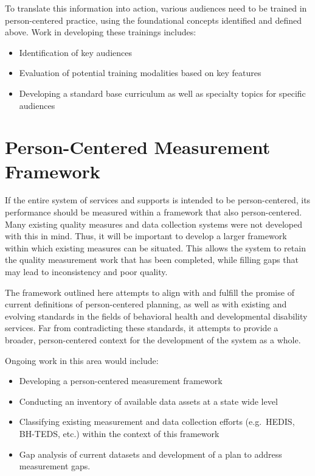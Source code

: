 \documentclass[
]{book}
\providecommand{\tightlist}{%
  \setlength{\itemsep}{0pt}\setlength{\parskip}{0pt}}
\begin{document}
To translate this information into action, various audiences need to be trained in person-centered practice, using the foundational concepts identified and defined above. Work in developing these trainings includes:

\begin{itemize}
\tightlist
\item
  Identification of key audiences
\item
  Evaluation of potential training modalities based on key features
\item
  Developing a standard base curriculum as well as specialty topics for specific audiences
\end{itemize}

\hypertarget{measure}{%
\chapter{Person-Centered Measurement Framework}\label{measure}}

If the entire system of services and supports is intended to be person-centered, its performance should be measured within a framework that also person-centered. Many existing quality measures and data collection systems were not developed with this in mind. Thus, it will be important to develop a larger framework within which existing measures can be situated. This allows the system to retain the quality measurement work that has been completed, while filling gaps that may lead to inconsistency and poor quality.

The framework outlined here attempts to align with and fulfill the promise of current definitions of person-centered planning, as well as with existing and evolving standards in the fields of behavioral health and developmental disability services. Far from contradicting these standards, it attempts to provide a broader, person-centered context for the development of the system as a whole.

Ongoing work in this area would include:

\begin{itemize}
\tightlist
\item
  Developing a person-centered measurement framework
\item
  Conducting an inventory of available data assets at a state wide level
\item
  Classifying existing measurement and data collection efforts (e.g.~HEDIS, BH-TEDS, etc.) within the context of this framework
\item
  Gap analysis of current datasets and development of a plan to address measurement gaps.
\end{itemize}
\end{document}
